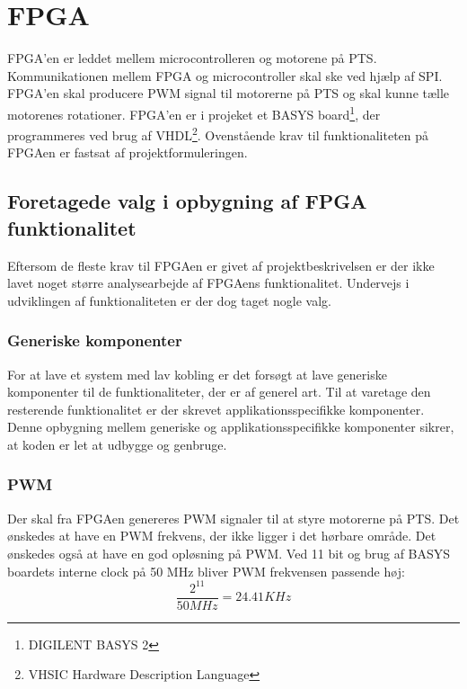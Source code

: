 \section{FPGA}
\label{sec:FPGA}
FPGA'en er leddet mellem microcontrolleren og motorene på PTS. 
Kommunikationen mellem FPGA og microcontroller skal ske ved hjælp af SPI. 
FPGA'en skal producere PWM signal til motorerne på PTS og skal kunne tælle motorenes rotationer. 
FPGA'en er i projeket et BASYS board\footnote{DIGILENT BASYS 2}, der programmeres ved brug af VHDL\footnote{VHSIC Hardware Description Language}.
Ovenstående krav til funktionaliteten på FPGAen er fastsat af 
projektformuleringen.

\subsection{Foretagede valg i opbygning af FPGA funktionalitet}
Eftersom de fleste krav til FPGAen er givet af projektbeskrivelsen er der ikke 
lavet noget større analysearbejde af FPGAens funktionalitet. Undervejs i 
udviklingen af funktionaliteten er der dog taget nogle valg.

\subsubsection*{Generiske komponenter}
For at lave et system med lav kobling er det forsøgt at lave 
generiske komponenter til de funktionaliteter, der er af generel art. 
Til at varetage den resterende funktionalitet er der skrevet applikationsspecifikke 
komponenter.
Denne opbygning mellem generiske og applikationsspecifikke komponenter sikrer, at koden er let at 
udbygge og genbruge.

\subsubsection*{PWM}
Der skal fra FPGAen genereres PWM signaler til at styre motorerne på PTS.
Det ønskedes at have en PWM frekvens, der ikke ligger i det hørbare område. 
Det ønskedes også at have en god opløsning på PWM. 
Ved 11 bit og brug af BASYS boardets interne clock på 50 MHz bliver PWM frekvensen passende høj:
\begin{equation}
  \frac{2^{11}}{50 MHz} = 24.41 KHz 
\end{equation}

